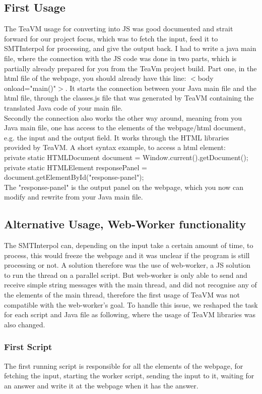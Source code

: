 \documentclass[12pt]{article}
\begin{document}
\subsection{First Usage}

The TeaVM usage for converting into JS was good documented and strait forward for our project focus, which was to fetch the input, feed it to SMTInterpol for processing, and give the output back. I had to write a java main file, where the connection with the JS code was done in two parts, which is partially already prepared for you from the TeaVm project build\cite{2}.
Part one, in the html file of the webpage, you should already have this line: $<$body onload="main()"$>$. It starts the connection between your Java main file and the html file, through the classes.js file that was generated by TeaVM containing the translated Java code of your main file.\\
Secondly the connection also works the other way around, meaning from you Java main file, one has access to the elements of the webpage/html document, e.g. the input and the output field. It works through the HTML libraries provided by TeaVM. A short syntax example, to access a html element:  \\
private static HTMLDocument document = Window.current().getDocument(); \\
private static HTMLElement responsePanel = document.getElementById("response-panel"); \\ The "response-panel" is the output panel on the webpage, which you now can modify and rewrite from your Java main file. 

\subsection{Alternative Usage, Web-Worker functionality}

The SMTInterpol can, depending on the input take a certain amount of time, to process, this would freeze the webpage and it was unclear if the program is still processing or not. A solution therefore was the use of web-worker, a JS solution to run the thread on a parallel script. But web-worker is only able to send and receive simple string messages with the main thread, and did not recognise any of the elements of the main thread, therefore the first usage of TeaVM was not compatible with the web-worker's goal. To handle this issue, we reshaped the task for each script and Java file as following, where the usage of TeaVM libraries was also changed.
\subsubsection{First Script}
The first running script is responsible for all the elements of the webpage, for fetching the input, starting the worker script, sending the input to it, waiting for an answer and write it at the webpage when it has the answer.
\end{document}
